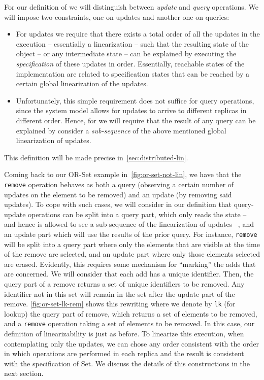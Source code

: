 For our definition of \CRDTLinshort{} we will distinguish between
\emph{update} and \emph{query} operations.
%
We will impose two constraints, one on updates and another one on
queries:
\begin{itemize}
\item For updates we require that there exists a total order of all
  the updates in the execution -- essentially a linearization -- such
  that the resulting state of the object -- or any intermediate state --
  can be explained by executing the \emph{specification} of these
  updates in order.
%
  Essentially, reachable states of the implementation are related to
  specification states that can be reached by a certain global
  linearization of the updates.
%
\item Unfortunately, this simple requirement does not suffice for
  query operations, since the system model allows for updates to arrive
  to different replicas in different order.
%
  Hence, for \CRDTLinshort{} we will require that the result of any
  query can be explained by consider a \emph{sub-sequence} of the above
  mentioned global linearization of updates.
\end{itemize}
This definition will be made precise in~\autoref{sec:distributed-lin}.

Coming back to our OR-Set example in~\autoref{fig:or-set-not-lin}, we
have that the \lstinline|remove| operation behaves as both a query
(observing a certain number of updates on the element to be removed)
and an update (by removing said updates).
%
To cope with such cases, we will consider in our definition that
query-update operations can be split into a query part, which only
reads the state -- and hence is allowed to see a sub-sequence of the
linearization of updates --, and an update part which will use the
results of the prior query.
%
For instance, \lstinline|remove| will be split into a query part where
only the elements that are visible at the time of the remove are
selected, and an update part where only those elements selected are
erased.
%
Evidently, this requires some mechanism for ``marking'' the adds that
are concerned.
%
We will consider that each add has a unique identifier.
%
Then, the query part of a remove returns a set of unique identifiers
to be removed.
%
Any identifier not in this set will remain in the set after the update
part of the remove.
%
\autoref{fig:or-set-lk-rem} shows this rewriting
where we denote by \lstinline|lk| (for lookup) the query part of
remove, which returns a set of elements to be removed, and a
\lstinline|remove| operation taking a set of elements to be removed.
%
In this case, our definition of linearizability is just as before.
%
To linearize this execution, when contemplating only the updates, we
can chose any order consistent with the order in which operations are
performed in each replica and the result is consistent with the
specification of Set.
%
We discuss the details of this constructions in the next section.


